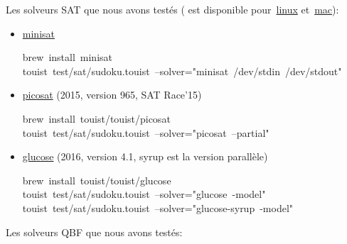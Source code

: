 \noindent Les solveurs SAT que nous avons testés ( est disponible pour~\href{http://linuxbrew.sh}{linux} et~\href{https://brew.sh}{mac}):%

\begin{itemize}%

\item{}
\href{http://minisat.se}{minisat}%
\begin{footnotesize}
\begin{mdpre}%
\noindent brew~install~minisat\\
touist~test/sat/sudoku.touist~--solver="minisat~/dev/stdin~/dev/stdout"%
\end{mdpre}%
\end{footnotesize}

\item{}
\href{http://fmv.jku.at/picosat}{picosat} (2015, version 965, SAT Race'15)%
\begin{footnotesize}
\begin{mdpre}%
\noindent brew~install~touist/touist/picosat\\
touist~test/sat/sudoku.touist~--solver="picosat~--partial"%
\end{mdpre}%
\end{footnotesize}

\item{}
\href{https://www.labri.fr/perso/lsimon/glucose}{glucose} (2016, version 4.1, syrup est la version parallèle)%
\begin{footnotesize}
\begin{mdpre}%
\noindent brew~install~touist/touist/glucose\\
touist~test/sat/sudoku.touist~--solver="glucose~-model"\\
touist~test/sat/sudoku.touist~--solver="glucose-syrup~-model"%
\end{mdpre}%
\end{footnotesize}%
\end{itemize}%

\noindent Les solveurs QBF que nous avons testés:%

